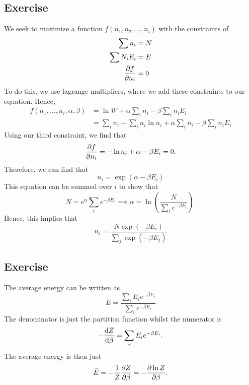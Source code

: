 \subsection{Exercise}
We seek to maximize a function $f(n_1, n_2, \dots, n_i)$ with the constraints of \begin{align}
    \sum n_i &= N \\
    \sum N_i E_i &= E \\
    \pdv{f}{n_i} &= 0
\end{align} 
To do this, we use lagrange multipliers, where we add these constraints to our equation. Hence, 
\begin{align}
    f(n_1, \dots, n_i, \alpha, \beta) &= \ln W + \alpha \sum_i n_i -\beta \sum_i n_i E_i \\
    &= \sum_i n_i  - \sum_i n_i \ln n_i  + \alpha \sum_i n_i - \beta \sum_i n_i E_i
\end{align}
Using our third constraint, we find that 
\begin{equation}
    \pdv{f}{n_i} = -\ln n_i + \alpha - \beta E_i = 0.
\end{equation}
Therefore, we can find that 
\begin{equation}
    n_i = \exp (\alpha - \beta E_i)
\end{equation}
This equation can be summed over $i$ to show that 
\begin{equation}
    N = e^{\alpha}\sum_i e^{-\beta E_i}\implies \alpha = \ln \left(\frac{N}{\sum_i e^{-\beta E_i}}\right).
\end{equation}
Hence, this implies that 
\begin{equation}
    n_i = \frac{N \exp (-\beta E_i)}{\sum_j \exp (-\beta E_j)}
\end{equation}
\subsection{Exercise}
The average energy can be written as 
\begin{equation}
    \bar E = \frac{\sum_i E_i e^{-\beta E_i}}{\sum_i e^{-\beta E_i}}
\end{equation}
The denominator is just the partition function whilst the numerator is 
\begin{equation}
    -\dv{Z}{\beta} = \sum_i E_i e^{-\beta E_i}.
\end{equation}
The average energy is then just 
\begin{equation}\label{e}
    \bar E = - \frac{1}{Z} \pdv{Z}{\beta} = - \pdv{\ln Z}{\beta}.
\end{equation}
